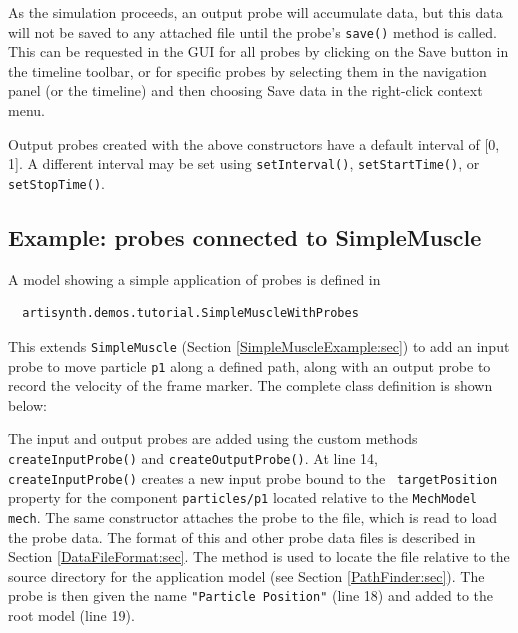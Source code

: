 \begin{sideblock}
As the simulation proceeds, an output probe will accumulate data, but
this data will not be saved to any attached file until the probe's
{\tt save()} method is called. This can be requested in the GUI for
all probes by clicking on the {\sf Save} button in the timeline
toolbar, or for specific probes by selecting them in the navigation
panel (or the timeline) and then choosing {\sf Save data} in the
right-click context menu.
\end{sideblock}

Output probes created with the above constructors have a default
interval of [0, 1]. A different interval may be set using
{\tt setInterval()}, {\tt setStartTime()}, or {\tt setStopTime()}.

\subsection{Example: probes connected to SimpleMuscle}
\label{SimpleMuscleWithProbes:sec}

A model showing a simple application of probes is defined in
%
\begin{verbatim}
  artisynth.demos.tutorial.SimpleMuscleWithProbes
\end{verbatim}
%
This extends {\tt SimpleMuscle} (Section
\ref{SimpleMuscleExample:sec}) to add an input probe to move particle
{\tt p1} along a defined path, along with an output probe to record
the velocity of the frame marker.  The complete class definition is
shown below:
%
\lstset{numbers=left}

\lstset{numbers=none}
%
The input and output probes are added using the custom methods {\tt
createInputProbe()} and {\tt createOutputProbe()}. At line 14, {\tt
createInputProbe()} creates a new input probe bound to the {\tt
targetPosition} property for the component {\tt particles/p1} located
relative to the {\tt MechModel} {\tt mech}. The same constructor
attaches the probe to the file, which is
read to load the probe data. The format of this and other probe data
files is described in Section \ref{DataFileFormat:sec}.  The method
is used to locate the file relative to the source directory for the
application model (see Section
\ref{PathFinder:sec}). The probe is then given the name {\tt "Particle
Position"} (line 18) and added to the root model (line 19).

